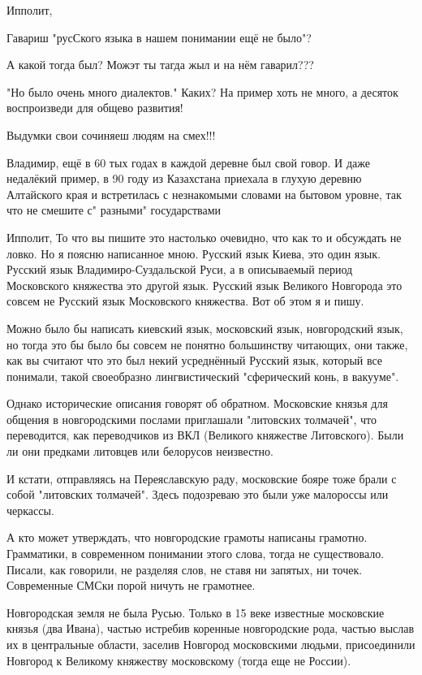 \begin{itemize}

Ипполит,

Гавариш "русСкого языка в нашем понимании ещё не было"?

А какой тогда был? Можэт ты тагда жыл и на нём гаварил???

"Но было очень много диалектов." Каких? На пример хоть не много, а десяток воспроизведи для общево развития!

Выдумки свои сочиняеш людям на смех!!!


Владимир, ещё в 60 тых годах в каждой деревне был свой говор. И даже недалёкий
пример, в 90 году из Казахстана приехала в глухую деревню Алтайского края и
встретилась с незнакомыми словами на бытовом уровне, так что не смешите с"
разными" государствами


Ипполит, То что вы пишите это настолько очевидно, что как то и обсуждать не
ловко. Но я поясню написанное мною. Русский язык Киева, это один язык. Русский
язык Владимиро-Суздальской Руси, а в описываемый период Московского княжества
это другой язык. Русский язык Великого Новгорода это совсем не Русский язык
Московского княжества. Вот об этом я и пишу.

Можно было бы написать киевский язык, московский язык, новгородский язык, но
тогда это бы было бы совсем не понятно большинству читающих, они также, как вы
считают что это был некий усреднённый Русский язык, который все понимали, такой
своеобразно лингвистический "сферический конь, в вакууме".

Однако исторические описания говорят об обратном. Московские князья для общения
в новгородскими послами приглашали "литовских толмачей", что переводится, как
переводчиков из ВКЛ (Великого княжестве Литовского). Были ли они предками
литовцев или белорусов неизвестно.

И кстати, отправляясь на Переяславскую раду, московские бояре тоже брали с
собой "литовских толмачей". Здесь подозреваю это были уже малороссы или
черкассы.


А кто может утверждать, что новгородские грамоты написаны грамотно. Грамматики,
в современном понимании этого слова, тогда не существовало. Писали, как
говорили, не разделяя слов, не ставя ни запятых, ни точек. Современные СМСки
порой ничуть не грамотнее.

Новгородская земля не была Русью. Только в 15 веке известные московские князья
(два Ивана), частью истребив коренные новгородские рода, частью выслав их в
центральные области, заселив Новгород московскими людьми, присоединили Новгород
к Великому княжеству московскому (тогда еще не России).


\end{itemize}
